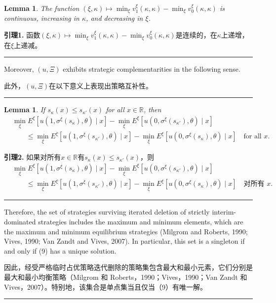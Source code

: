 \documentclass[12pt,a4paper]{article}
\newenvironment{original}
  {\par\medskip\noindent\color{black}\ignorespaces}
  {\par\medskip}
\newenvironment{translation}
  {\par\noindent\color{darkblue}\ignorespaces}
  {\par\medskip\noindent\hrule\par\medskip}
\newtheorem{lemma}[theorem]{Lemma}
\theoremstyle{definition}
\theoremstyle{remark}
\begin{document}
\begin{lemma}
The function $(\xi, \kappa) \mapsto \min_{\xi} v_1^\xi(\kappa, \kappa) - \min_{\xi} v_0^\xi(\kappa, \kappa)$ is continuous, increasing in $\kappa$, and decreasing in $\xi$.
\end{lemma}
\begin{translation}
\color{darkblue}\textbf{引理1.} 函数$(\xi, \kappa) \mapsto \min_{\xi} v_1^\xi(\kappa, \kappa) - \min_{\xi} v_0^\xi(\kappa, \kappa)$是连续的，在$\kappa$上递增，在$\xi$上递减。
\end{translation}

\begin{original}
Moreover, $(u, \Xi)$ exhibits strategic complementarities in the following sense.
\end{original}
\begin{translation}
此外，$(u, \Xi)$在以下意义上表现出策略互补性。
\end{translation}

\begin{lemma}
If $s_\kappa(x) \le s_{\kappa'}(x)$ for all $x \in \mathbb{R}$, then
\begin{align*}
&\min_{\xi} E^\xi[u(1, \sigma^\xi(s_\kappa), \theta) \mid x] - \min_{\xi} E^\xi[u(0, \sigma^\xi(s_{\kappa'}), \theta) \mid x]\\
&\qquad \le \min_{\xi} E^\xi[u(1, \sigma^\xi(s_{\kappa'}), \theta) \mid x] - \min_{\xi} E^\xi[u(0, \sigma^\xi(s_\kappa), \theta) \mid x] \quad \text{for all } x.
\end{align*}
\end{lemma}
\begin{translation}
\color{darkblue}\textbf{引理2.} 如果对所有$x \in \mathbb{R}$有$s_\kappa(x) \le s_{\kappa'}(x)$，则
\begin{align*}
&\min_{\xi} E^\xi[u(1, \sigma^\xi(s_\kappa), \theta) \mid x] - \min_{\xi} E^\xi[u(0, \sigma^\xi(s_{\kappa'}), \theta) \mid x]\\
&\qquad \le \min_{\xi} E^\xi[u(1, \sigma^\xi(s_{\kappa'}), \theta) \mid x] - \min_{\xi} E^\xi[u(0, \sigma^\xi(s_\kappa), \theta) \mid x] \quad \text{对所有 } x.
\end{align*}
\end{translation}

\begin{original}
Therefore, the set of strategies surviving iterated deletion of strictly interim-dominated strategies includes the maximum and minimum elements, which are the maximum and minimum equilibrium strategies (Milgrom and Roberts, 1990; Vives, 1990; Van Zandt and Vives, 2007). In particular, this set is a singleton if and only if (9) has a unique solution.
\end{original}
\begin{translation}
因此，经受严格临时占优策略迭代删除的策略集包含最大和最小元素，它们分别是最大和最小均衡策略（Milgrom 和 Roberts，1990；Vives，1990；Van Zandt 和 Vives，2007）。特别地，该集合是单点集当且仅当（9）有唯一解。
\end{translation}
\end{document}
